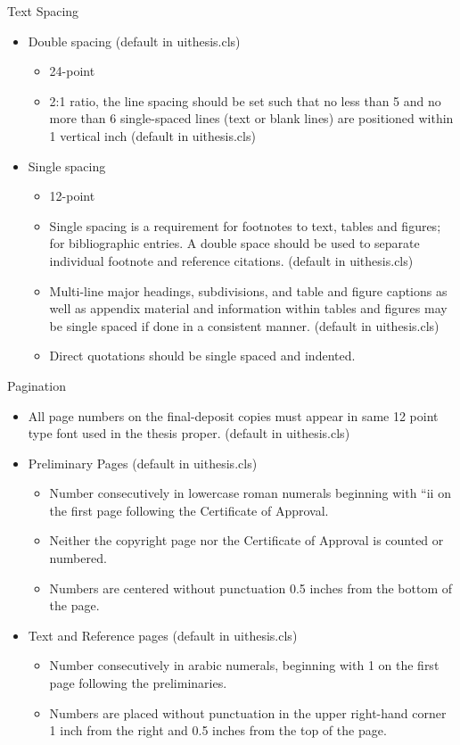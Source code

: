 \noindent Text Spacing
\begin{itemize}
\item Double spacing (default in uithesis.cls)

\begin{itemize}
\item 24-point
\item 2:1 ratio, the line spacing should be set such that no less than 5
and no more than 6 single-spaced lines (text or blank lines) are positioned
within 1 vertical inch (default in uithesis.cls)
\end{itemize}
\item Single spacing

\begin{itemize}
\item 12-point
\item Single spacing is a requirement for footnotes to text, tables and
figures; for bibliographic entries. A double space should be used
to separate individual footnote and reference citations. (default
in uithesis.cls)
\item Multi-line major headings, subdivisions, and table and figure captions
as well as appendix material and information within tables and figures
may be single spaced if done in a consistent manner. (default in uithesis.cls)
\item Direct quotations should be single spaced and indented.
\end{itemize}
\end{itemize}
Pagination
\begin{itemize}
\item All page numbers on the final-deposit copies must appear in same 12
point type font used in the thesis proper. (default in uithesis.cls)
\item Preliminary Pages (default in uithesis.cls)

\begin{itemize}
\item Number consecutively in lowercase roman numerals beginning with \textquotedblleft{}ii
on the first page following the Certificate of Approval.
\item Neither the copyright page nor the Certificate of Approval is counted
or numbered.
\item Numbers are centered without punctuation 0.5 inches from the bottom
of the page.
\end{itemize}
\item Text and Reference pages (default in uithesis.cls)

\begin{itemize}
\item Number consecutively in arabic numerals, beginning with 1 on the first
page following the preliminaries.
\item Numbers are placed without punctuation in the upper right-hand corner
1 inch from the right and 0.5 inches from the top of the page.
\end{itemize}
\end{itemize}

